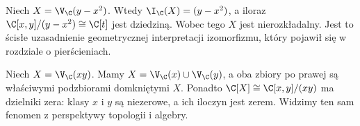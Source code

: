 \begin{przyklad}
Niech $X=\V_{\C}(y-x^2)$.
Wtedy $\I_{\C}(X)=(y-x^2)$, a iloraz
$\C[x,y]/(y-x^2)\cong\C[t]$ jest dziedziną.
Wobec tego $X$ jest nierozkładalny.
Jest to ścisłe uzasadnienie geometrycznej interpretacji
izomorfizmu, który pojawił się w rozdziale o pierścieniach.
\end{przyklad}

\begin{przyklad}
Niech $X=\V_{\C}(xy)$.
Mamy $X=\V_{\C}(x)\cup\V_{\C}(y)$,
a oba zbiory po prawej są właściwymi podzbiorami domkniętymi
$X$. Ponadto $\C[X]\cong\C[x,y]/(xy)$ ma dzielniki zera:
klasy $x$ i $y$ są niezerowe, a ich iloczyn jest zerem.
Widzimy ten sam fenomen z perspektywy topologii i algebry.
\end{przyklad}

